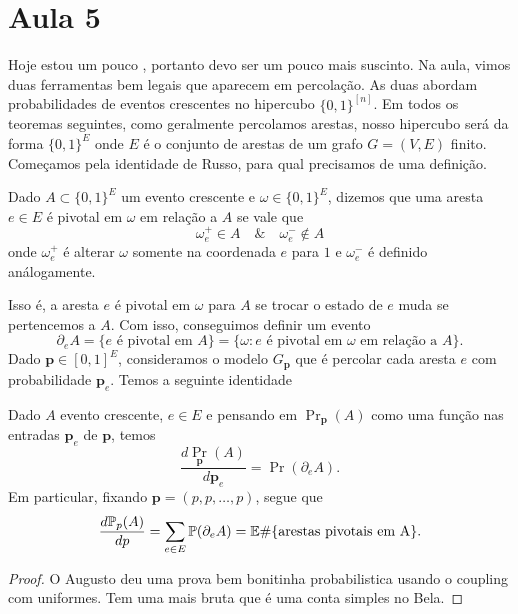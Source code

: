 \section{Aula 5}

Hoje estou um pouco \Frowny, portanto devo ser um pouco mais suscinto.
Na aula, vimos duas  ferramentas bem legais que aparecem em
percolação. As duas abordam probabilidades de eventos crescentes
no hipercubo $\{0,1\}^{[n]}$. Em todos os teoremas seguintes, como
geralmente percolamos arestas,
nosso hipercubo será da forma
$\{0,1\}^{E}$ onde $E$ é o conjunto de arestas de um grafo $G = (V,E)$ finito.
Começamos pela identidade de Russo, para qual precisamos de uma definição.

\begin{definition}
	Dado $A \subset \{0,1\}^E$ um evento crescente e $\omega \in \{0,
	1\}^E$, dizemos
	que uma aresta $e \in E$ é pivotal em $\omega$ em relação a $A$ se vale que
	\[\omega_e^{+} \in A \quad \& \quad \omega_e^- \not \in A\]
	onde $\omega_e^+$ é alterar $\omega$ somente na coordenada $e$ para
	$1$ e $\omega_e^-$
	é definido análogamente.
\end{definition}

Isso é, a aresta $e$ é pivotal em $\omega$ para $A$ se trocar o
estado de $e$ muda se pertencemos a $A$.
Com isso, conseguimos definir um evento
\[
	\partial_e A = \{e \text{ é pivotal em } A\} = \{\omega: e \text{ é
	pivotal em $\omega$ em relação a } A\}.
\]
Dado $\bm{p} \in [0,1]^{E}$, consideramos o modelo $G_{\bm{p}}$ que é percolar
cada aresta $e$ com probabilidade $\bm{p}_e$. Temos a seguinte identidade

\begin{theorem}
	\label{trm:russo}
	Dado $A$ evento crescente, $e \in E$ e pensando em $\Pr_{\bm{p}}(A)$
	como uma função nas entradas $\bm{p}_e$ de $\bm{p}$, temos
	\begin{equation*}
		\frac{d\Pr_{\bm{p}}(A)}{d\bm{p}_e} = \Pr(\partial_e A).
	\end{equation*}
	Em particular, fixando $\bm{p} = (p,p,\dots, p)$, segue que
	\[
		\frac{d\mathbb{P}_p(A)}{dp} = \sum_{e \in E} \mathbb{P}(\partial_e A) = \mathbb{E}
		\#\{\text{arestas pivotais em A}\}.
	\]
\end{theorem}

\begin{proof}
	O Augusto deu uma prova bem bonitinha probabilistica usando o coupling
	com uniformes. Tem uma mais bruta que é uma conta simples no Bela.
\end{proof}

